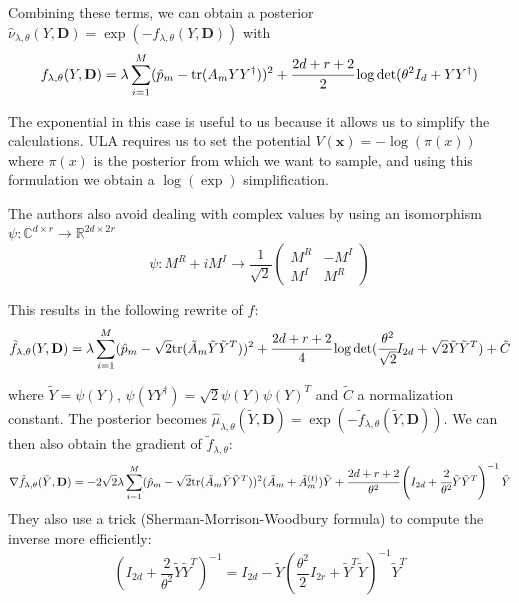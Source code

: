 \documentclass[12pt]{memoir}
\newcommand{\tr}{\text{tr}}
\newcommand{\mb}{\mathbf}
\begin{document}
Combining these terms, we can obtain a posterior $\hat \nu_{\lambda, \theta}(Y, \mb D) = \exp(-f_{\lambda, \theta}(Y, \mb D))$ with
\begin{equation}
    f_{\lambda, \theta}(Y, \mb D) = \lambda \sum^{M}_{i=1} (\hat p_m - \tr(A_mYY^\dagger))^2 + \cfrac{2d + r + 2}{2}\log \det(\theta^2I_d + YY^\dagger)
\end{equation}

The exponential in this case is useful to us because it allows us to simplify the calculations. ULA requires us to set the potential $V(\mb x) = -\log(\pi(x))$ where $\pi(x)$ is the posterior from which we want to sample, and using this formulation we obtain a $\log(\exp)$ simplification.\medbreak

The authors also avoid dealing with complex values by using an isomorphism $\psi: \mathbb{C}^{d\times r}\rightarrow \mathbb{R}^{2d\times 2r}$
\begin{equation}
\psi: M^R + iM^I \rightarrow \frac{1}{\sqrt 2} \begin{pmatrix}

    M^R & - M^I\\

    M^I & M^R

\end{pmatrix}
\end{equation}


This results in the following rewrite of $f$:
\begin{equation}    
\tilde f_{\lambda, \theta}(Y, \mb D) = \lambda \sum^{M}_{i=1} (\hat p_m - \sqrt{2}\tr(\tilde A_m \tilde Y \tilde Y^{T}))^2 + \cfrac{2d + r + 2}{4}\log \det(\cfrac{\theta^2}{\sqrt 2}I_{2d} + \sqrt 2 \tilde Y \tilde Y^{T}) + \tilde C
\end{equation}


where $\tilde Y = \psi(Y)$, $\psi(YY^\dagger) = \sqrt{2} \psi(Y)\psi(Y)^{T}$ and $\tilde C$ a normalization constant. The posterior becomes $\hat \mu_{\lambda, \theta}(\tilde Y, \mb D) =\exp(-\tilde f_{\lambda, \theta}(\tilde Y, \mb D))$. We can then also obtain the gradient of $\tilde f_{\lambda, \theta}$:
\begin{equation}
\nabla \tilde f_{\lambda, \theta}(\tilde Y, \mb D) = -2\sqrt 2 \lambda \sum^{M}_{i=1} (\hat p_m - \sqrt{2}\tr(\tilde A_m \tilde Y \tilde Y^{T}))^2 (\tilde A_m + \tilde A^{(t)}_m)\tilde Y + \cfrac{2d + r + 2}{\theta^2} \left(I_{2d} + \cfrac{2}{\theta^2}\tilde Y \tilde Y^{T}\right)^{-1} \tilde Y
\end{equation}
They also use a trick (Sherman-Morrison-Woodbury formula) to compute the inverse more efficiently:
\begin{equation}
\left( I_{2d} + \frac{2}{\theta^2} \tilde Y \tilde Y^{T} \right)^{-1} =  I_{2d} - \tilde Y \left( \frac{\theta^2}{2} I_{2r}+\tilde Y^{T} \tilde Y \right)^{-1} \tilde Y^{T}
\end{equation}
\end{document}
